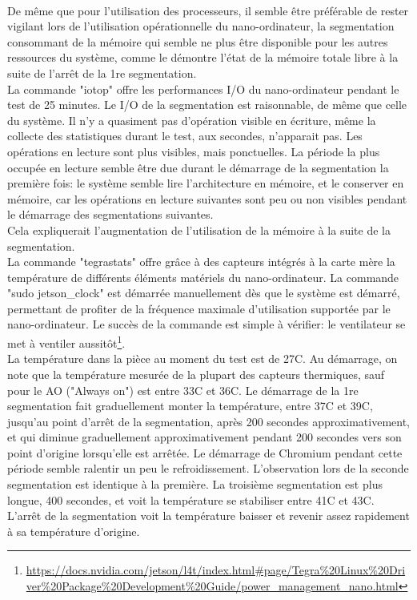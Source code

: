 \vspace{\baselineskip}
\\
\noindent De même que pour l'utilisation des processeurs, il semble être préférable de rester vigilant lors de l'utilisation opérationnelle du nano-ordinateur, la segmentation consommant de la mémoire qui semble ne plus être disponible pour les autres ressources du système, comme le démontre l'état de la mémoire totale libre à la suite de l'arrêt de la 1re segmentation. 
\vspace{\baselineskip}
\\
\noindent La commande "iotop" offre les performances I/O du nano-ordinateur pendant le test de 25 minutes. Le I/O de la segmentation est raisonnable, de même que celle du système. Il n'y a quasiment pas d'opération visible en écriture, même la collecte des statistiques durant le test, aux secondes, n'apparait pas. Les opérations en lecture sont plus visibles, mais ponctuelles. La période la plus occupée en lecture semble être due durant le démarrage de la segmentation la première fois: le système semble lire l'architecture en mémoire, et le conserver en mémoire, car les opérations en lecture suivantes sont peu ou non visibles pendant le démarrage des segmentations suivantes.
\vspace{\baselineskip}
\\
\noindent Cela expliquerait l'augmentation de l'utilisation de la mémoire à la suite de la segmentation. 
\vspace{\baselineskip}
\\
\noindent La commande "tegrastats" offre grâce à des capteurs intégrés à la carte mère la température de différents éléments matériels du nano-ordinateur. La commande "sudo jetson\_clock" est démarrée manuellement dès que le système est démarré, permettant de profiter de la fréquence maximale d'utilisation supportée par le nano-ordinateur. Le succès de la commande est simple à vérifier: le ventilateur se met à ventiler aussitôt\footnote{\url{https://docs.nvidia.com/jetson/l4t/index.html#page/Tegra\%20Linux\%20Driver\%20Package\%20Development\%20Guide/power_management_nano.html}}.
\vspace{\baselineskip}
\\
\noindent La température dans la pièce au moment du test est de 27C. Au démarrage, on note que la température mesurée de la plupart des capteurs thermiques, sauf pour le AO ("Always on") est entre 33C et 36C. Le démarrage de la 1re segmentation fait graduellement monter la température, entre 37C et 39C, jusqu'au point d'arrêt de la segmentation, après 200 secondes approximativement, et qui diminue graduellement approximativement pendant 200 secondes vers son point d'origine lorsqu'elle est arrêtée. Le démarrage de Chromium pendant cette période semble ralentir un peu le refroidissement. L'observation lors de la seconde segmentation est identique à la première. La troisième segmentation est plus longue, 400 secondes, et voit la température se stabiliser entre 41C et 43C. L'arrêt de la segmentation voit la température baisser et revenir assez rapidement à sa température d'origine. 
